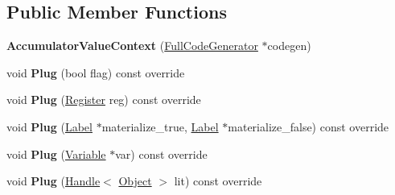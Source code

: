 \subsection*{Public Member Functions}
\begin{DoxyCompactItemize}
\item 
{\bfseries Accumulator\+Value\+Context} (\hyperlink{classv8_1_1internal_1_1_full_code_generator}{Full\+Code\+Generator} $\ast$codegen)\hypertarget{classv8_1_1internal_1_1_full_code_generator_1_1_accumulator_value_context_acaf85d1dacd64e3889ffd29fd6e8b5e6}{}\label{classv8_1_1internal_1_1_full_code_generator_1_1_accumulator_value_context_acaf85d1dacd64e3889ffd29fd6e8b5e6}

\item 
void {\bfseries Plug} (bool flag) const  override\hypertarget{classv8_1_1internal_1_1_full_code_generator_1_1_accumulator_value_context_a132632b035aa524bb5bd52f06024d7e6}{}\label{classv8_1_1internal_1_1_full_code_generator_1_1_accumulator_value_context_a132632b035aa524bb5bd52f06024d7e6}

\item 
void {\bfseries Plug} (\hyperlink{structv8_1_1internal_1_1_register}{Register} reg) const  override\hypertarget{classv8_1_1internal_1_1_full_code_generator_1_1_accumulator_value_context_ac5b465e0ef98af1602b8948253acd919}{}\label{classv8_1_1internal_1_1_full_code_generator_1_1_accumulator_value_context_ac5b465e0ef98af1602b8948253acd919}

\item 
void {\bfseries Plug} (\hyperlink{classv8_1_1internal_1_1_label}{Label} $\ast$materialize\+\_\+true, \hyperlink{classv8_1_1internal_1_1_label}{Label} $\ast$materialize\+\_\+false) const  override\hypertarget{classv8_1_1internal_1_1_full_code_generator_1_1_accumulator_value_context_a4b9053a97b77e077e5f245924f3d532b}{}\label{classv8_1_1internal_1_1_full_code_generator_1_1_accumulator_value_context_a4b9053a97b77e077e5f245924f3d532b}

\item 
void {\bfseries Plug} (\hyperlink{classv8_1_1internal_1_1_variable}{Variable} $\ast$var) const  override\hypertarget{classv8_1_1internal_1_1_full_code_generator_1_1_accumulator_value_context_a4fd6b87fc575c3014627896ffc7f2c1b}{}\label{classv8_1_1internal_1_1_full_code_generator_1_1_accumulator_value_context_a4fd6b87fc575c3014627896ffc7f2c1b}

\item 
void {\bfseries Plug} (\hyperlink{classv8_1_1internal_1_1_handle}{Handle}$<$ \hyperlink{classv8_1_1internal_1_1_object}{Object} $>$ lit) const  override\hypertarget{classv8_1_1internal_1_1_full_code_generator_1_1_accumulator_value_context_ab3c75037693081717e8385c2e9b84a93}{}\label{classv8_1_1internal_1_1_full_code_generator_1_1_accumulator_value_context_ab3c75037693081717e8385c2e9b84a93}


\end{DoxyCompactItemize}
